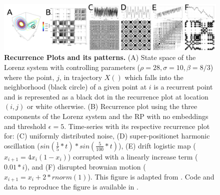 \documentclass[fleqn,10pt]{wlscirep}
\begin{document}
\begin{figure}[ht]
\centering
\includegraphics[width=1.0\textwidth]{fig-rps.pdf}
    \caption{
	{\bf Recurrence Plots and its patterns.} 
	(A) State space of the Lorenz system with controlling parameters 
	($\rho=28, \sigma=10, \beta=8/3$) where the point, $j$, in trajectory $X()$ which falls into the neighborhood 
	(black circle) of a given point at $i$ is a recurrent point and is 
	represented as a black dot in the recurrence plot at location 
	$(i, j)$ or white otherwise.
	(B) Recurrence plot using the 
	three components of the Lorenz system and the RP with no embeddings 
	and threshold $\epsilon=5$.
	Time-series with its respective recurrence plot for:
	(C) uniformly distributed noise,
	(D) super-positionet harmonic oscillation 
	($sin( \frac{1}{5}*t) * sin( \frac{5}{100}*t) $),
	(E) drift logistic map ($x_{i+1} = 4 x_i (1- x_i) $) corrupted 
	with a linearly increase term ($0.01*i$), and
	(F) disrupted brownian motion  ($x_{i+1} = x_i + 2*rnorm(1) $).
	This figure is adapted from \cite{marwan2015}.
	Code and data to reproduce the figure is available in \cite{srep2020}.
	}
    \label{fig:rps}
\end{figure}



\end{document}
